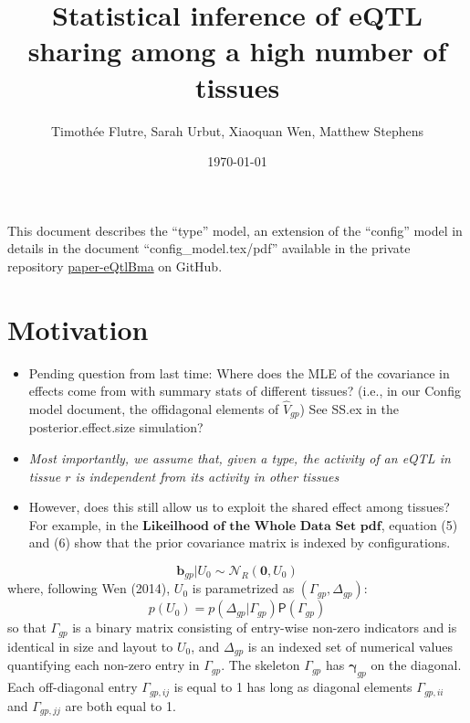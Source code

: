 \documentclass[10pt]{article}
\newcommand{\Prd}{\mathsf{P}} %
\newcommand{\Norm}{{\mathcal{N}}} %
\begin{document}
\title{Statistical inference of eQTL sharing among a high number of tissues}
\author{Timoth\'{e}e Flutre, Sarah Urbut, Xiaoquan Wen, Matthew Stephens}
\date{\today}

\maketitle


\vspace{1cm}

This document describes the ``type'' model, an extension of the ``config'' model in details in the document ``config\_model.tex/pdf'' available in the private repository \href{https://github.com/stephenslab/paper-eQtlBma}{paper-eQtlBma} on GitHub.



\section{Motivation}

\begin{itemize}
\item Pending question from last time: Where does the MLE of the covariance in effects come from with summary stats of different tissues? (i.e., in our Config model document, the offidagonal elements of $\hat V_{gp}$) See SS.ex in the posterior.effect.size simulation?

\item \emph{Most importantly, we assume that, given a type, the activity of an eQTL in tissue $r$ is independent from its activity in other tissues}

\item However, does this still allow us to exploit the shared effect among tissues? For example, in the $\textbf{Likeilhood of the Whole Data Set pdf}$, equation (5) and (6) show that the prior covariance matrix is indexed by configurations.
\end{itemize}

\begin{equation}
  \bm{b}_{gp} | U_{0} \sim \Norm_R(\bm{0}, U_{0})
\end{equation}
where, following Wen (2014), $U_{0}$ is parametrized as $(\Gamma_{gp},\Delta_{gp})$:
\begin{equation}
  p(U_{0}) = p(\Delta_{gp} | \Gamma_{gp}) \Prd(\Gamma_{gp})
\end{equation}
so that $\Gamma_{gp}$ is a binary matrix consisting of entry-wise non-zero indicators and is identical in size and layout to $U_{0}$, and $\Delta_{gp}$ is an indexed set of numerical values quantifying each non-zero entry in $\Gamma_{gp}$.
The skeleton $\Gamma_{gp}$ has $\bm{\gamma}_{gp}$ on the diagonal. Each off-diagonal entry $\Gamma_{gp,ij}$ is equal to 1 has long as diagonal elements $\Gamma_{gp,ii}$ and $\Gamma_{gp,jj}$ are both equal to 1.
\end{document}
